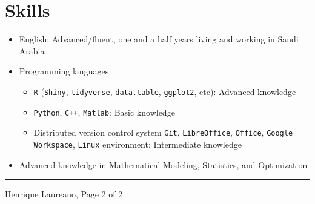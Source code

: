 \documentclass[12pt]{article}
\newcommand{\horrule}[1]{\noindent\rule{\linewidth}{#1}}
\begin{document}
\section*{Skills}

\begin{itemize}
 \item English: Advanced/fluent, one and a half years living and working
       in Saudi Arabia
 \item Programming languages
  \begin{itemize}
   \item \texttt{R} (\texttt{Shiny}, \texttt{tidyverse},
                     \texttt{data.table}, \texttt{ggplot2}, etc):
         Advanced knowledge
   \item \texttt{Python}, \texttt{C++}, \texttt{Matlab}: Basic knowledge
   \item Distributed version control system \texttt{Git},
         \texttt{LibreOffice}, \texttt{Office},
         \texttt{Google Workspace}, \texttt{Linux} environment:
         Intermediate knowledge
  \end{itemize}
 \item Advanced knowledge in Mathematical Modeling, Statistics, and
       Optimization
\end{itemize}

\vspace{\fill}
\horrule{1pt}
\noindent Henrique Laureano, \hfill Page 2 of 2
\end{document}
